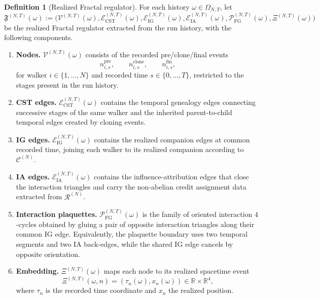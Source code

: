 \documentclass[11pt]{article}
\theoremstyle{definition}
\newtheorem{definition}[theorem]{Definition}
\theoremstyle{remark}
\newcommand{\R}{\mathbb R}
\newcommand{\mcE}{\mathcal E}
\newcommand{\mcC}{\mathcal C}
\newcommand{\mcP}{\mathcal P}
\newcommand{\mcV}{\mathcal V}
\newcommand{\mcR}{\mathcal R}
\begin{document}
\begin{definition}[Realized Fractal regulator]
\label{def:realized-fractal-regulator}
For each history \(\omega\in\Omega_{N,T}\), let
\[
\mathfrak F^{(N,T)}(\omega)
:=
\bigl(
\mcV^{(N,T)}(\omega),
\mcE_{\mathrm{CST}}^{(N,T)}(\omega),
\mcE_{\mathrm{IG}}^{(N,T)}(\omega),
\mcE_{\mathrm{IA}}^{(N,T)}(\omega),
\mcP_{\mathrm{FG}}^{(N,T)}(\omega),
\Xi^{(N,T)}(\omega)
\bigr)
\]
be the realized Fractal regulator extracted from the run history, with the
following components.
\begin{enumerate}[leftmargin=1.5em,label=\textnormal{(\roman*)}]
\item \textbf{Nodes.}
\(\mcV^{(N,T)}(\omega)\) consists of the recorded pre/clone/final events
\[
n_{i,s}^{\mathrm{pre}},\qquad
n_{i,s}^{\mathrm{clone}},\qquad
n_{i,s}^{\mathrm{fin}},
\]
for walker \(i\in\{1,\dots,N\}\) and recorded time \(s\in\{0,\dots,T\}\),
restricted to the stages present in the run history.
\item \textbf{CST edges.}
\(\mcE_{\mathrm{CST}}^{(N,T)}(\omega)\) contains the temporal genealogy edges
connecting successive stages of the same walker and the inherited
parent-to-child temporal edges created by cloning events.
\item \textbf{IG edges.}
\(\mcE_{\mathrm{IG}}^{(N,T)}(\omega)\) contains the realized companion edges at
common recorded time, joining each walker to its realized companion according
to \(\mcC^{(N)}\).
\item \textbf{IA edges.}
\(\mcE_{\mathrm{IA}}^{(N,T)}(\omega)\) contains the influence-attribution edges
that close the interaction triangles and carry the non-abelian credit
assignment data extracted from \(\mcR^{(N)}\).
\item \textbf{Interaction plaquettes.}
\(\mcP_{\mathrm{FG}}^{(N,T)}(\omega)\) is the family of oriented interaction
\(4\)-cycles obtained by gluing a pair of opposite interaction triangles along
their common IG edge. Equivalently, the plaquette boundary uses two temporal
segments and two IA back-edges, while the shared IG edge cancels by opposite
orientation.
\item \textbf{Embedding.}
\(\Xi^{(N,T)}(\omega)\) maps each node to its realized spacetime event
\[
\Xi^{(N,T)}(\omega,n)=(\tau_n(\omega),x_n(\omega))\in\R\times\R^4,
\]
where \(\tau_n\) is the recorded time coordinate and \(x_n\) the realized
position.
\end{enumerate}
\end{definition}
\end{document}
